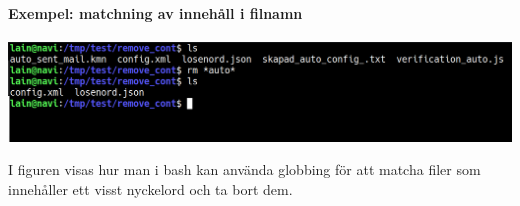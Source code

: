 \paragraph{Exempel: matchning av innehåll i filnamn}
\begin{center}
        \includegraphics[width=\linewidth]{bilder/bash_remove_files_cont.png}
\end{center}
I figuren visas hur man i bash kan använda globbing för att matcha filer som innehåller ett visst nyckelord och ta bort dem.
